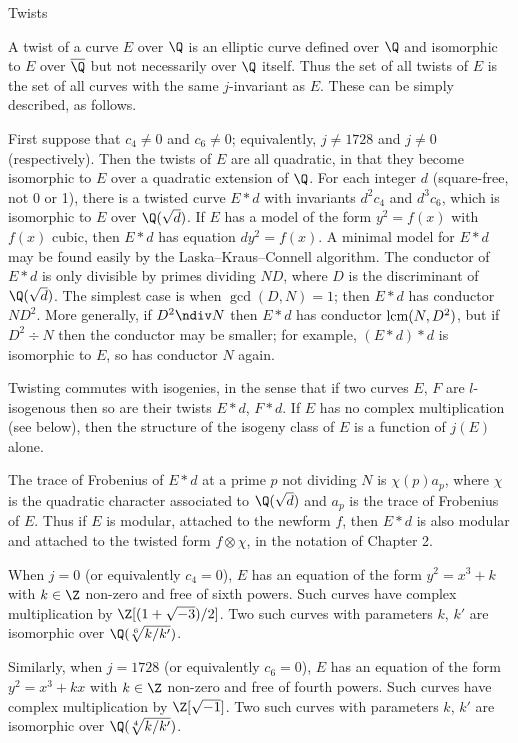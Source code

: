 \subhead Twists \endsubhead

A twist of a curve $E$ over $\Q$ is an elliptic curve defined 
over $\Q$ and isomorphic to $E$ over $\overline{\Q}$ but not necessarily 
over $\Q$ itself.  Thus the set of all twists of $E$ is the set of all 
curves with the same $j$-invariant as $E$.  These can be simply 
described, as follows.

First suppose that $c_4\not=0$ and $c_6\not=0$; equivalently,
$j\not=1728$ and $j\not=0$ (respectively).  Then the twists of $E$ are
all quadratic, in that they become isomorphic to $E$ over a quadratic
extension of $\Q$.  For each integer $d$ (square-free, not 0 or 1),
there is a twisted curve $E*d$ with invariants $d^2c_4$ and $d^3c_6$,
which is isomorphic to $E$ over $\Q(\sqrt{d})$.  If $E$ has a model of
the form $y^2=f(x)$ with $f(x)$ cubic, then $E*d$ has equation
$dy^2=f(x)$.  A minimal model for $E*d$ may be found easily by the
Laska--Kraus--Connell algorithm.  The conductor of $E*d$ is only
divisible by primes dividing $ND$, where $D$ is the discriminant of
$\Q(\sqrt{d})$.  The simplest case is when $\gcd(D,N)=1$; then $E*d$
has conductor $ND^2$.  More generally, if $D^2\ndiv N$ then $E*d$ has
conductor $\hbox{\rm lcm}(N,D^2)$, but if $D^2\div N$ then the conductor may be
smaller; for example, $(E*d)*d$ is isomorphic to $E$, so has conductor
$N$ again.

Twisting commutes with isogenies, in the sense that if two curves $E$,
$F$ are $l$-isogenous then so are their twists $E*d$, $F*d$.  If $E$
has no complex multiplication (see below), then the structure of the
isogeny class of $E$ is a function of $j(E)$ alone.

The trace of Frobenius of $E*d$ at a prime $p$ not dividing $N$ is
$\chi(p)a_p$, where $\chi$ is the quadratic character associated to
$\Q(\sqrt{d})$ and $a_p$ is the trace of Frobenius of $E$.  Thus if
$E$ is modular, attached to the newform $f$, then $E*d$ is also
modular and attached to the twisted form $f\otimes\chi$, in the
notation of Chapter 2.

When $j=0$ (or equivalently $c_4=0$), $E$ has an equation of the form
$y^2=x^3+k$ with $k\in\Z$ non-zero and free of sixth powers.  Such
curves have complex multiplication by $\Z[(1+\sqrt{-3})/2]$.  Two such
curves with parameters $k$, $k'$ are isomorphic over
$\Q(\root6\of{k/k'})$.

Similarly, when $j=1728$ (or equivalently $c_6=0$), $E$ has an
equation of the form $y^2=x^3+kx$ with $k\in\Z$ non-zero and free of
fourth powers.  Such curves have complex multiplication by
$\Z[\sqrt{-1}]$.  Two such curves with parameters $k$, $k'$ are
isomorphic over $\Q(\root4\of{k/k'})$.

